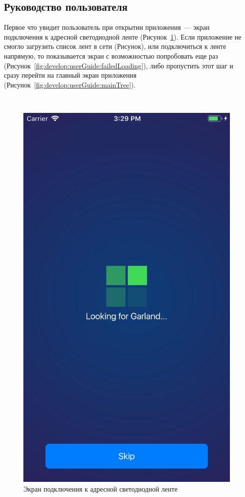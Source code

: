\subsection{Руководство пользователя}
\label{sec:develop:userGuide}

Первое что увидит пользователь при открытии приложения~--- экран подключения к адресной светодиодной ленте (Рисунок~\ref{fig:develop:userGuide:loading}). Если приложение не смогло загрузить список лент в сети (Рисунок), или подключиться к ленте напрямую, то показывается экран с возможностью попробовать еще раз (Рисунок~\ref{fig:develop:userGuide:failedLoading}), либо пропустить этот шаг и сразу перейти на главный экран приложения (Рисунок~\ref{fig:develop:userGuide:mainTree}).

~
\begin{figure}[H]
\centering
	\includegraphics[scale=0.2]{figures/userGuide/loading.png}
	\caption{Экран подключения к адресной светодиодной ленте}
	\label{fig:develop:userGuide:loading}
\end{figure}

